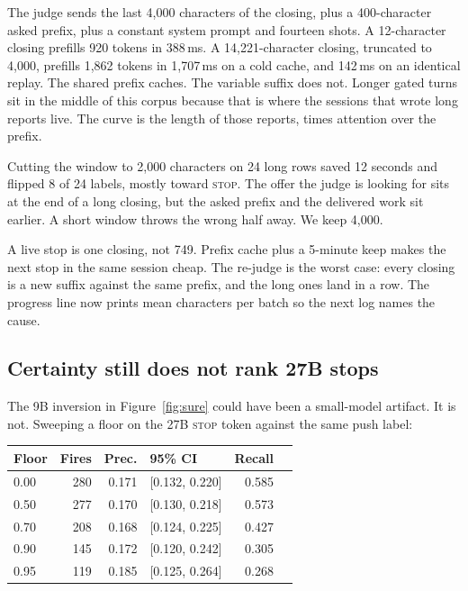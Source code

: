 The judge sends the last 4{,}000 characters of the closing, plus a
400-character asked prefix, plus a constant system prompt and fourteen
shots. A 12-character closing prefills 920 tokens in 388\,ms. A
14{,}221-character closing, truncated to 4{,}000, prefills 1{,}862
tokens in 1{,}707\,ms on a cold cache, and 142\,ms on an identical
replay. The shared prefix caches. The variable suffix does not. Longer
gated turns sit in the middle of this corpus because that is where the
sessions that wrote long reports live. The curve is the length of those
reports, times attention over the prefix.

Cutting the window to 2{,}000 characters on 24 long rows saved 12
seconds and flipped 8 of 24 labels, mostly toward \textsc{stop}. The
offer the judge is looking for sits at the end of a long closing, but
the asked prefix and the delivered work sit earlier. A short window
throws the wrong half away. We keep 4{,}000.

A live stop is one closing, not 749. Prefix cache plus a 5-minute keep
makes the next stop in the same session cheap. The re-judge is the
worst case: every closing is a new suffix against the same prefix, and
the long ones land in a row. The progress line now prints mean
characters per batch so the next log names the cause.

\subsection{Certainty still does not rank 27B stops}
\label{sec:sure27}

The 9B inversion in Figure~\ref{fig:sure} could have been a small-model
artifact. It is not. Sweeping a floor on the 27B \textsc{stop} token
against the same push label:

\begin{center}
{\small\begin{tabular}{lrrlrr}
\toprule
Floor & Fires & Prec. & 95\% CI & Recall \\
\midrule
0.00 & 280 & 0.171 & [0.132, 0.220] & 0.585 \\
0.50 & 277 & 0.170 & [0.130, 0.218] & 0.573 \\
0.70 & 208 & 0.168 & [0.124, 0.225] & 0.427 \\
0.90 & 145 & 0.172 & [0.120, 0.242] & 0.305 \\
0.95 & 119 & 0.185 & [0.125, 0.264] & 0.268 \\
\bottomrule
\end{tabular}}
\end{center}

